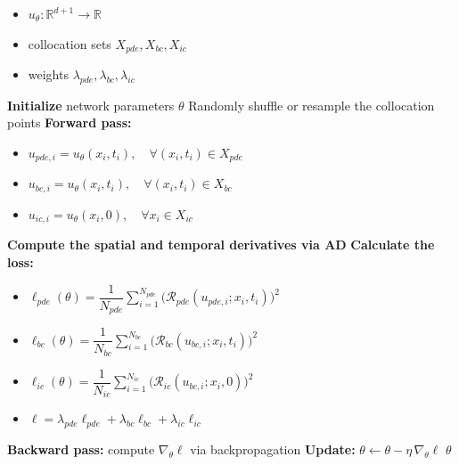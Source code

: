 
\begin{algorithm}[H]
\caption{PINN training}
\begin{algorithmic}[1]
    \Require 
    \begin{itemize} 
    \item $u_\theta:\mathbb{R}^{d+1}\to\mathbb{R}$
    \item collocation sets $X_{pde}, X_{bc}, X_{ic}$
    \item weights $\lambda_{pde}, \lambda_{bc}, \lambda_{ic}$
    \end{itemize} 
    \State \textbf{Initialize} network parameters $\theta$
        \State Randomly shuffle or resample the collocation points
        \State \textbf{Forward pass:}
        \begin{itemize} 
            \item $u_{pde,i} = u_\theta(x_i,t_i),\quad \forall(x_i,t_i)\in X_{pde}$
            \item $u_{bc,i} = u_\theta(x_i,t_i),\quad \forall(x_i,t_i)\in X_{bc}$
            \item $u_{ic,i} = u_\theta(x_i,0),\quad \forall x_i\in X_{ic}$
        \end{itemize} 
        \State \textbf{Compute the spatial and temporal derivatives via AD}
        \State \textbf{Calculate the loss:}
        \begin{itemize} 
        \item $\ell_{pde}(\theta) = \dfrac{1}{N_{pde}}\displaystyle\sum_{i=1}^{N_{pde}} \big(\mathcal R_{pde}(u_{pde,i};x_i,t_i)\big)^2$
        \item $\ell_{bc}(\theta) = \dfrac{1}{N_{bc}}\displaystyle\sum_{i=1}^{N_{bc}} \big(\mathcal R_{bc}(u_{bc,i};x_i,t_i)\big)^2$
        \item $\ell_{ic}(\theta) = \dfrac{1}{N_{ic}}\displaystyle\sum_{i=1}^{N_{ic}} \big(\mathcal R_{ic}(u_{bc,i};x_i,0)\big)^2$
        \item $\ell = \lambda_{pde}\ell_{pde} + \lambda_{bc}\ell_{bc} + \lambda_{ic}\ell_{ic}$
        \end{itemize} 
        \State \textbf{Backward pass:} compute $\nabla_\theta \ell$ via backpropagation
        \State \textbf{Update:} $\theta \leftarrow \theta - \eta\,\nabla_\theta \ell$
    \EndFor
    \State \Return $\theta$
\end{algorithmic}
\end{algorithm}



